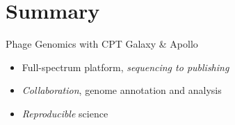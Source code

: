 \documentclass[12pt]{phage3slides} %
\begin{document}
{%
  \begin{frame}[plain]
  \end{frame}
}

\section{Summary}
\begin{frame}{Phage Genomics with CPT Galaxy \& Apollo}
	\begin{itemize}
		\item Full-spectrum platform, \emph{sequencing to publishing}
		\item \emph{Collaboration}, genome annotation and analysis
		\item \emph{Reproducible} science
	\end{itemize}
\end{frame}

\informationErasche%
\end{document}
